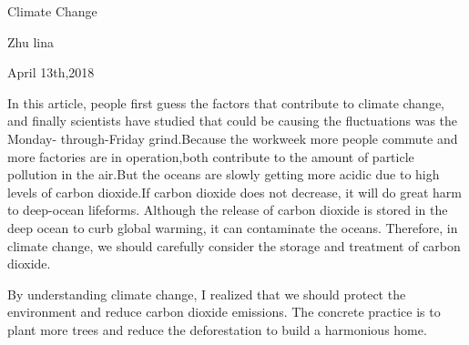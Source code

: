 \documentclass{article}
\begin{document}
                                     	\begin{center} 
                                  Climate Change\\  
                                        \end{center}               
                     
                                         \begin{center} 
                                         	Zhu lina\\
                                         	\end{center}
                                           \begin{center} 
                                             April 13th,2018\\
                                           \end{center}
      \par  In this article, people first guess the factors that contribute to climate change,
      and finally scientists have studied that could be causing the fluctuations was the Monday-
      through-Friday grind.Because the workweek more people commute and more factories are in 
      operation,both contribute to the amount of particle pollution in the air.But the oceans 
      are slowly getting more acidic due to high levels of carbon dioxide.If carbon dioxide
      does not decrease, it will do great harm to deep-ocean lifeforms. Although the release 
      of carbon dioxide is stored in the deep ocean to curb global warming, it can contaminate
      the oceans. Therefore, in climate change, we should carefully consider the storage and
      treatment of carbon dioxide.
      \par By understanding climate change, I realized that we should protect the environment 
      and reduce carbon dioxide emissions. The concrete practice is to plant more trees and 
      reduce the deforestation to build a harmonious home.
\end{document}
